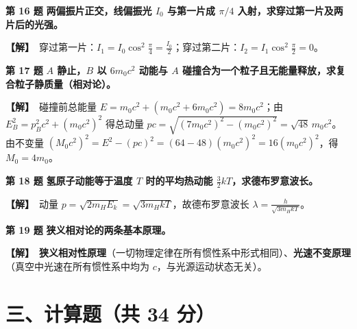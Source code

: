 \documentclass[zihao=5,a4paper,UTF8]{ctexart}
\newenvironment{prob}[2]{%
    \par\vspace{5pt}\noindent\textbf{\color{navy}#1} \textbf{#2}\par\nopagebreak\vspace{2pt}%
}{%
    \par\vspace{3pt}%
}
\newcommand{\sol}{\noindent\textbf{\color{tealaccent}【解】}\ }
\begin{document}
\begin{prob}{第 16 题}{两偏振片正交，线偏振光 $I_0$ 与第一片成 $\pi/4$ 入射，求穿过第一片及两片后的光强。}
\sol 穿过第一片：$I_1 = I_0\cos^2\frac{\pi}{4} = \frac{I_0}{2}$；穿过第二片：$I_2 = I_1\cos^2\frac{\pi}{2} = 0$。
\end{prob}

\begin{prob}{第 17 题}{$A$ 静止，$B$ 以 $6m_0c^2$ 动能与 $A$ 碰撞合为一个粒子且无能量释放，求复合粒子静质量（相对论）。}
\sol 碰撞前总能量 $E = m_0c^2 + (m_0c^2 + 6m_0c^2) = 8m_0c^2$；由 $E_B^2 = p_B^2 c^2 + (m_0c^2)^2$ 得总动量 $pc = \sqrt{(7m_0c^2)^2 - (m_0c^2)^2} = \sqrt{48}\,m_0c^2$。由不变量 $(M_0c^2)^2 = E^2 - (pc)^2 = (64 - 48)(m_0c^2)^2 = 16(m_0c^2)^2$，得 $M_0 = 4m_0$。
\end{prob}

\begin{prob}{第 18 题}{氢原子动能等于温度 $T$ 时的平均热动能 $\frac{3}{2}kT$，求德布罗意波长。}
\sol 动量 $p = \sqrt{2m_H E_k} = \sqrt{3m_H kT}$，故德布罗意波长 $\lambda = \frac{h}{\sqrt{3m_H kT}}$。
\end{prob}

\begin{prob}{第 19 题}{狭义相对论的两条基本原理。}
\sol \textbf{狭义相对性原理}（一切物理定律在所有惯性系中形式相同）、\textbf{光速不变原理}（真空中光速在所有惯性系中均为 $c$，与光源运动状态无关）。
\end{prob}

\section*{三、计算题（共 34 分）}
\end{document}
